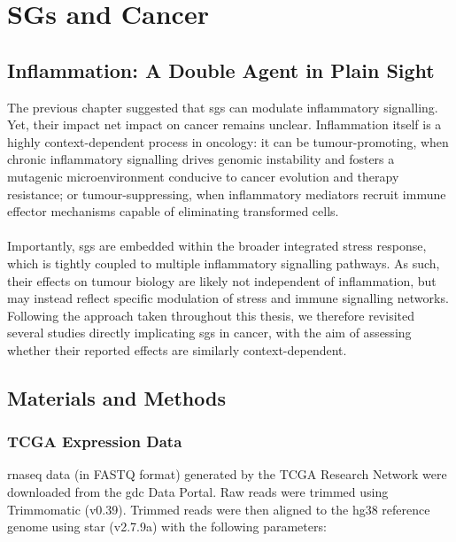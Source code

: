 \chapter{SGs and Cancer}
\label{chap:ChapterV}

\section{Inflammation: A Double Agent in Plain Sight}

The previous chapter suggested that \glspl{sg} can modulate inflammatory signalling. Yet, their impact net impact on cancer remains unclear. Inflammation itself is a highly context-dependent process in oncology: it can be tumour-promoting, when chronic inflammatory signalling drives genomic instability and fosters a mutagenic microenvironment conducive to cancer evolution and therapy resistance; or tumour-suppressing, when inflammatory mediators recruit immune effector mechanisms capable of eliminating transformed cells\cite{turizo-smith_inflammation_2024}.
\\
\\
Importantly, \glspl{sg} are embedded within the broader integrated stress response, which is tightly coupled to multiple inflammatory signalling pathways. As such, their effects on tumour biology are likely not independent of inflammation, but may instead reflect specific modulation of stress and immune signalling networks. Following the approach taken throughout this thesis, we therefore revisited several studies directly implicating \glspl{sg} in cancer, with the aim of assessing whether their reported effects are similarly context-dependent.

\section{Materials and Methods}

\subsection{TCGA Expression Data}

\gls{rnaseq} data (in FASTQ format) generated by the TCGA Research Network were downloaded from the \gls{gdc} Data Portal\cite{network_cancer_nodate, heath_nci_2021}. Raw reads were trimmed using Trimmomatic (v0.39)\cite{bolger_trimmomatic_2014}. Trimmed reads were then aligned to the \gls{hg38} reference genome using \gls{star} (v2.7.9a)\cite{dobin_star_2013} with the following parameters:

